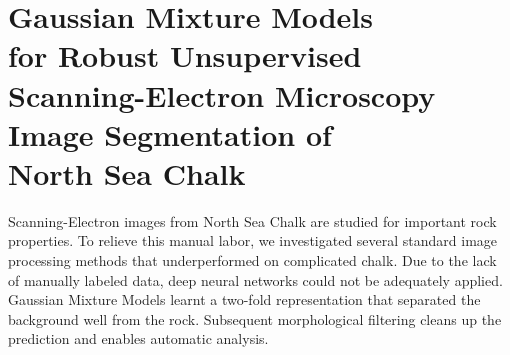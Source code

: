 \chapter[Gaussian Mixture Models for Robust Unsupervised Scanning-Electron Microscopy Image Segmentation of North Sea Chalk]{Gaussian Mixture Models\\for Robust Unsupervised\\\hspace*{-2cm}Scanning-Electron Microscopy\\Image Segmentation of\\North Sea Chalk}

Scanning-Electron images from North Sea Chalk are studied for important rock properties. To relieve this manual labor, we investigated several standard image processing methods that underperformed on complicated chalk. Due to the lack of manually labeled data, deep neural networks could not be adequately applied. Gaussian Mixture Models learnt a two-fold representation that separated the background well from the rock. Subsequent morphological filtering cleans up the prediction and enables automatic analysis. 

{\vfill\hfill\newline{}}


